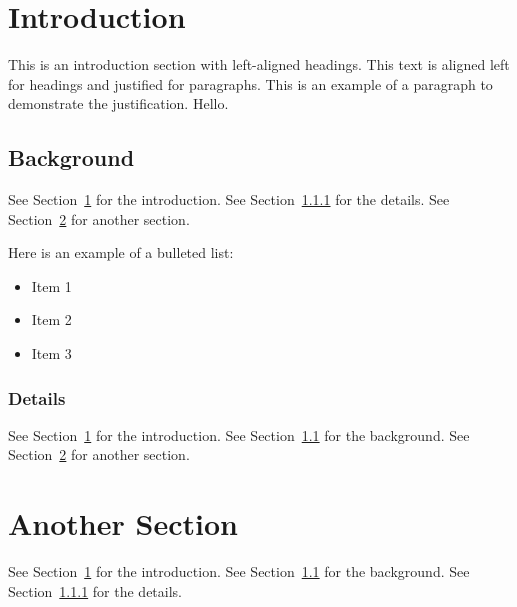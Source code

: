 \documentclass[12pt]{article}
\begin{document}
\tableofcontents

\newpage %

\section{Introduction}
\label{sec:introduction}
This is an introduction section with left-aligned headings. This text is aligned left for headings and justified for paragraphs. This is an example of a paragraph to demonstrate the justification. Hello.

\subsection{Background}
\label{sec:background}
See Section~\ref{sec:introduction} for the introduction.
See Section~\ref{sec:details} for the details.
See Section~\ref{sec:another-section} for another section.

Here is an example of a bulleted list:
  \begin{itemize}
    \item Item 1
  \item Item 2
  \item Item 3
\end{itemize}

\subsubsection{Details}
\label{sec:details}
See Section~\ref{sec:introduction} for the introduction.
See Section~\ref{sec:background} for the background.
See Section~\ref{sec:another-section} for another section.

\section{Another Section}
\label{sec:another-section}
See Section~\ref{sec:introduction} for the introduction.
See Section~\ref{sec:background} for the background.
See Section~\ref{sec:details} for the details.
\end{document}
